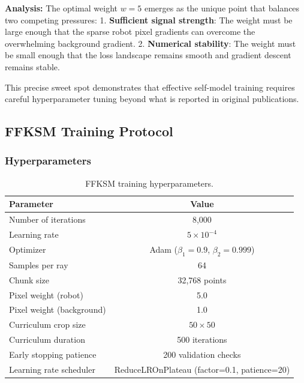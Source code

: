 \documentclass[12pt,a4paper,oneside]{report}
\begin{document}
\textbf{Analysis:} The optimal weight $w = 5$ emerges as the unique point that balances two competing pressures:
1. \textbf{Sufficient signal strength}: The weight must be large enough that the sparse robot pixel gradients can overcome the overwhelming background gradient.
2. \textbf{Numerical stability}: The weight must be small enough that the loss landscape remains smooth and gradient descent remains stable.

This precise sweet spot demonstrates that effective self-model training requires careful hyperparameter tuning beyond what is reported in original publications.

\subsection{FFKSM Training Protocol}
\label{subsec:ffksm_training_protocol}

\subsubsection{Hyperparameters}

\begin{table}[H]
\centering
\caption{FFKSM training hyperparameters.}
\label{tab:ffksm_hyperparams}
\begin{tabular}{lc}
\toprule
Parameter & Value \\
\midrule
Number of iterations & 8,000 \\
Learning rate & $5 \times 10^{-4}$ \\
Optimizer & Adam ($\beta_1=0.9$, $\beta_2=0.999$) \\
Samples per ray & 64 \\
Chunk size & 32,768 points \\
Pixel weight (robot) & 5.0 \\
Pixel weight (background) & 1.0 \\
Curriculum crop size & $50 \times 50$ \\
Curriculum duration & 500 iterations \\
Early stopping patience & 200 validation checks \\
Learning rate scheduler & ReduceLROnPlateau (factor=0.1, patience=20) \\
\bottomrule
\end{tabular}
\end{table}
\end{document}
